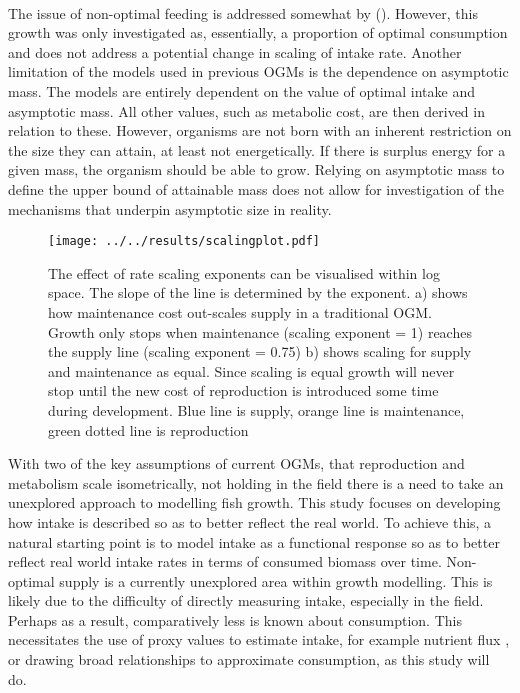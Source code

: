 \documentclass[a4paper, 11pt, hidelinks]{article} %
\begin{document}
	\\
	The issue of non-optimal feeding is addressed somewhat by \citeauthor{Hou2011} (\citeyear{Hou2011}).  However, this growth was only investigated as, essentially, a proportion of optimal consumption and does not address a potential change in scaling of intake rate.
	Another limitation of the models used in previous OGMs is the dependence on asymptotic mass.  The models are entirely dependent on the value of optimal intake and asymptotic mass.  All other values, such as metabolic cost, are then derived in relation to these.  However, organisms are not born with an inherent restriction on the size they can attain, at least not energetically.  If there is surplus energy for a given mass, the organism should be able to grow.  Relying on asymptotic mass to define the upper bound of attainable mass does not allow for investigation of the mechanisms that underpin asymptotic size in reality. 
	\begin{figure}[h]
		\centering
		\texttt{[image: ../../results/scalingplot.pdf]}
		\caption{The effect of rate scaling exponents can be visualised within log space.  The slope of the line is determined by the exponent.  a) shows how maintenance cost out-scales supply in a traditional OGM.  Growth only stops when maintenance (scaling exponent = 1) reaches the supply line (scaling exponent = 0.75)  b) shows scaling for supply and maintenance as equal. Since scaling is equal growth will never stop until the new cost of reproduction is introduced some time during development.  Blue line is supply, orange line is maintenance, green dotted line is reproduction}
		\label{scaling_plot}
	\end{figure}
	With two of the key assumptions of current OGMs, that reproduction and metabolism scale isometrically, not holding in the field \parencite{Barneche2018, Pawar2012, Peters1983} there is a need to take an unexplored approach to modelling fish growth.  This study focuses on developing how intake is described so as to better reflect the real world.  To achieve this, a natural starting point is to model intake as a functional response \parencite{Holling1959} so as to better reflect real world intake rates in terms of consumed biomass over time.  Non-optimal supply is a currently unexplored area within growth modelling.  This is likely due to the difficulty of directly measuring intake, especially in the field. Perhaps as a result, comparatively less is known about consumption.  This necessitates the use of proxy values to estimate intake, for example nutrient flux \parencite{Schiettekatte2020}, or drawing broad relationships to approximate consumption, as this study will do.
\end{document}
